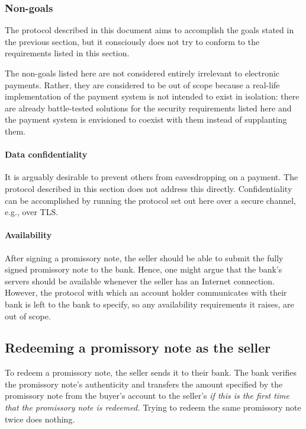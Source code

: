 \documentclass[12pt,a4paper]{article}
\begin{document}
\begin{multicols}{2}
	\subsubsection{Non-goals}

	The protocol described in this document aims to accomplish the goals stated in the previous section, but it consciously does not try to conform to the requirements listed in this section.

	The non-goals listed here are not considered entirely irrelevant to electronic payments. Rather, they are considered to be out of scope because a real-life implementation of the payment system is not intended to exist in isolation: there are already battle-tested solutions for the security requirements listed here and the payment system is envisioned to coexist with them instead of supplanting them.

	\paragraph{Data confidentiality}

	It is arguably desirable to prevent others from eavesdropping on a payment. The protocol described in this section does not address this directly. Confidentiality can be accomplished by running the protocol set out here over a secure channel, e.g., over TLS.

	\paragraph{Availability}

	After signing a promissory note, the seller should be able to submit the fully signed promissory note to the bank. Hence, one might argue that the bank's servers should be available whenever the seller has an Internet connection. However, the protocol with which an account holder communicates with their bank is left to the bank to specify, so any availability requirements it raises, are out of scope.

	\subsection{Redeeming a promissory note as the seller}

	To redeem a promissory note, the seller sends it to their bank. The bank verifies the promissory note's authenticity and transfers the amount specified by the promissory note from the buyer's account to the seller's \emph{if this is the first time that the promissory note is redeemed.} Trying to redeem the same promissory note twice does nothing.
	

\end{multicols}
\end{document}
